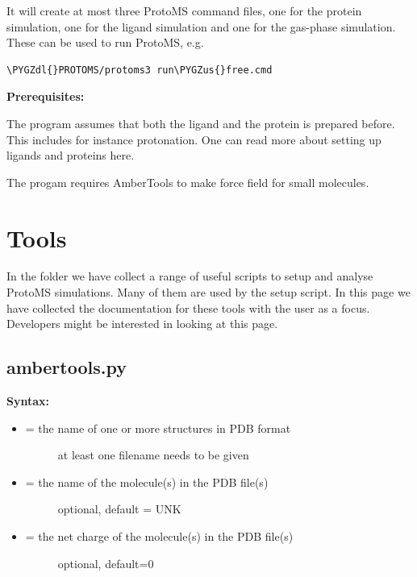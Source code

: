 \documentclass[letterpaper,10pt,english]{sphinxmanual}
\def\PYGZus{\char`\_}
\def\PYGZdl{\char`\$}
\begin{document}
It will create at most three ProtoMS command files, one for the protein simulation, one for the ligand simulation and one for the gas-phase simulation. These can be used to run ProtoMS, e.g.

\begin{Verbatim}[commandchars=\\\{\}]
\PYGZdl{}PROTOMS/protoms3 run\PYGZus{}free.cmd
\end{Verbatim}

\textbf{Prerequisites:}

The program assumes that both the ligand and the protein is prepared before. This includes for instance protonation. One can read more about setting up ligands and proteins here.

The progam requires AmberTools to make force field for small molecules.


\chapter{Tools}
\label{tools:tools}\label{tools::doc}
In the  folder we have collect a range of useful scripts to setup and analyse ProtoMS simulations. Many of them are used by the  setup script. In this page we have collected the documentation for these tools with the user as a focus. Developers might be interested in looking at this page.


\section{ambertools.py}
\label{tools:ambertools-py}
\textbf{Syntax:}

\begin{itemize}
\item {} \begin{description}
\item[{ = the name of one or more structures in PDB format}] \leavevmode
at least one filename needs to be given

\end{description}

\item {} \begin{description}
\item[{ = the name of the molecule(s) in the PDB file(s)}] \leavevmode
optional, default = UNK

\end{description}

\item {} \begin{description}
\item[{ = the net charge of the molecule(s) in the PDB file(s)}] \leavevmode
optional, default=0

\end{description}

\end{itemize}
\end{document}
